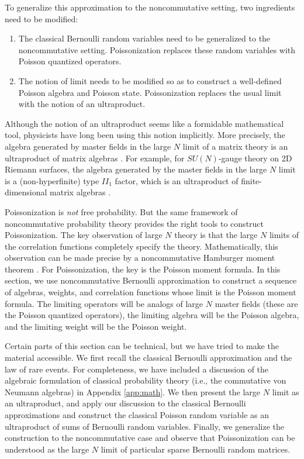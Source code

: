 \documentclass[a4paper,11pt]{article}
\theoremstyle{definition}
\numberwithin{equation}{section}
\begin{document}
To generalize this approximation to the noncommutative setting, two ingredients need to be modified:
\begin{enumerate}
    \item The classical Bernoulli random variables need to be generalized to the noncommutative setting. Poissonization replaces these random variables with Poisson quantized operators.
    \item The notion of limit needs to be modified so as to construct a well-defined Poisson algebra and Poisson state. Poissonization replaces the usual limit with the notion of an ultraproduct.
\end{enumerate}
Although the notion of an ultraproduct seems like a formidable mathematical tool, physicists have long been using this notion implicitly. More precisely, the algebra generated by master fields in the large $N$ limit of a matrix theory is an ultraproduct of matrix algebras \cite{statmech, singer, voiculescu1, VND, accardi1, Speicher:1993kt}. For example, for $SU(N)$-gauge theory on 2D Riemann surfaces, the algebra generated by the master fields in the large $N$ limit is a (non-hyperfinite) type $II_1$ factor, which is an ultraproduct of finite-dimensional matrix algebras \cite{singer}. 

Poissonization is \textit{not} free probability. But the same framework of noncommutative probability theory provides the right tools to construct Poissonization. The key observation of large $N$ theory is that the large $N$ limits of the correlation functions completely specify the theory. Mathematically, this observation can be made precise by a noncommutative Hamburger moment theorem \cite{MAW}. For Poissonization, the key is the Poisson moment formula. In this section, we use noncommutative Bernoulli approximation to construct a sequence of algebras, weights, and correlation functions whose limit is the Poisson moment formula. The limiting operators will be analogs of large $N$ master fields (these are the Poisson quantized operators), the limiting algebra will be the Poisson algebra, and the limiting weight will be the Poisson weight.

Certain parts of this section can be technical, but we have tried to make the material accessible. We first recall the classical Bernoulli approximation and the law of rare events. For completeness, we have included a discussion of the algebraic formulation of classical probability theory (i.e., the commutative von Neumann algebras) in Appendix \ref{app:math}. We then present the large $N$ limit as an ultraproduct, and apply our discussion to the classical Bernoulli approximations and construct the classical Poisson random variable as an ultraproduct of sums of Bernoulli random variables. Finally, we generalize the construction to the noncommutative case and observe that Poissonization can be understood as the large $N$ limit of particular sparse Bernoulli random matrices.
\end{document}
